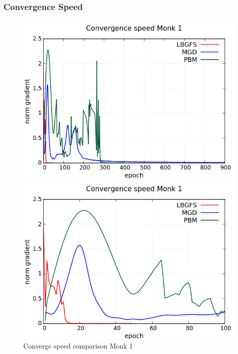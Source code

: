 \subsubsection{Convergence Speed}
\begin{figure}[H]
	\centering
	\begin{minipage}[t]{0.5\linewidth}
		\includegraphics[width=\linewidth]{data/Comparison/Monk1/Monk1_CS_Comparison_standard.png}
	\end{minipage}%
	\begin{minipage}[t]{0.5\linewidth}
		\includegraphics[width=\linewidth]{data/Comparison/Monk1/Monk1_CS_Comparison_zoom.png}
	\end{minipage}
	\caption{Converge speed comparison Monk 1}
	\label{CS-Monk1}
\end{figure}
